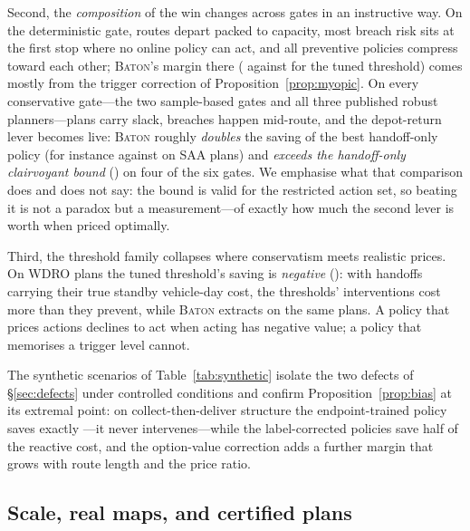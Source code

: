 \documentclass[preprint,authoryear,12pt]{elsarticle}
\theoremstyle{definition}
\theoremstyle{remark}
\begin{document}
Second, the \emph{composition} of the win changes across gates in an
instructive way. On the deterministic gate, routes depart packed to
capacity, most breach risk sits at the first stop where no online
policy can act, and all preventive policies compress toward each other;
\textsc{Baton}'s margin there (\svDetBaton{} against \svDetThresh{} for
the tuned threshold) comes mostly from the trigger correction of
Proposition~\ref{prop:myopic}. On every conservative gate---the two
sample-based gates and all three published robust planners---plans
carry slack, breaches happen mid-route, and the depot-return lever
becomes live: \textsc{Baton} roughly \emph{doubles} the saving of the
best handoff-only policy (for instance \svSAABaton{} against
\svSAAHo{} on \textsc{SAA} plans) and \emph{exceeds the handoff-only
clairvoyant bound} (\svSAAOrc{}) on four of the six gates. We emphasise
what that comparison does and does not say: the bound is valid for the
restricted action set, so beating it is not a paradox but a
measurement---of exactly how much the second lever is worth when priced
optimally.

Third, the threshold family collapses where conservatism meets
realistic prices. On \textsc{WDRO} plans the tuned threshold's saving
is \emph{negative} (\svWDROThresh{}): with handoffs carrying their true
standby vehicle-day cost, the thresholds' interventions cost more than
they prevent, while \textsc{Baton} extracts \svWDROBaton{} on the same
plans. A policy that prices actions declines to act when acting has
negative value; a policy that memorises a trigger level cannot.

The synthetic scenarios of Table~\ref{tab:synthetic} isolate the two
defects of \S\ref{sec:defects} under controlled conditions and confirm
Proposition~\ref{prop:bias} at its extremal point: on
collect-then-deliver structure the endpoint-trained policy saves
exactly \ctdVOne{}---it never intervenes---while the label-corrected
policies save half of the reactive cost, and the option-value
correction adds a further margin that grows with route length and the
price ratio.



\subsection{Scale, real maps, and certified plans}\label{sec:large}
\end{document}
